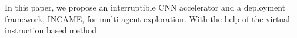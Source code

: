 \label{sec:conclusion}

In this paper, we propose an interruptible CNN accelerator and a deployment framework, INCAME, for multi-agent exploration. With the help of the virtual-instruction based method